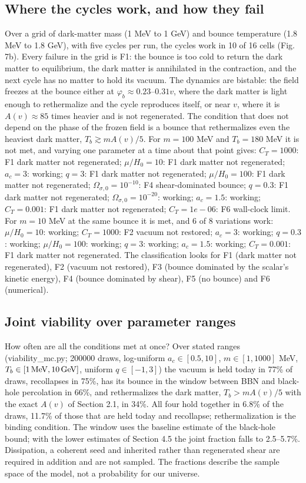 \documentclass[pdflatex,sn-mathphys-num]{sn-jnl}
\begin{document}
\subsection{Where the cycles work, and how they fail}
Over a grid of dark-matter mass (1 MeV to 1 GeV) and bounce temperature (1.8 MeV to 1.8 GeV), with five cycles per run, the cycles work in 10 of 16 cells (Fig. 7b). Every failure in the grid is F1: the bounce is too cold to return the dark matter to equilibrium, the dark matter is annihilated in the contraction, and the next cycle has no matter to hold its vacuum. The dynamics are bistable: the field freezes at the bounce either at $\varphi_b\approx0.23$--$0.31v$, where the dark matter is light enough to rethermalize and the cycle reproduces itself, or near $v$, where it is $A(v)\approx85$ times heavier and is not regenerated. The condition that does not depend on the phase of the frozen field is a bounce that rethermalizes even the heaviest dark matter, $T_b\gtrsim mA(v)/5$. For $m=100$ MeV and $T_b=180$ MeV it is not met, and varying one parameter at a time about that point gives: $C_T=1000$: F1 dark matter not regenerated; $\mu/H_0=10$: F1 dark matter not regenerated; $a_c=3$: working; $q=3$: F1 dark matter not regenerated; $\mu/H_0=100$: F1 dark matter not regenerated; $\Omega_{\sigma,0}=10^{-10}$: F4 shear-dominated bounce; $q=0.3$: F1 dark matter not regenerated; $\Omega_{\sigma,0}=10^{-20}$: working; $a_c=1.5$: working; $C_T=0.001$: F1 dark matter not regenerated; $C_T=1e-06$: F6 wall-clock limit. For $m=10$ MeV at the same bounce it is met, and 6 of 8 variations work: $\mu/H_0=10$: working; $C_T=1000$: F2 vacuum not restored; $a_c=3$: working; $q=0.3$: working; $\mu/H_0=100$: working; $q=3$: working; $a_c=1.5$: working; $C_T=0.001$: F1 dark matter not regenerated. The classification looks for F1 (dark matter not regenerated), F2 (vacuum not restored), F3 (bounce dominated by the scalar's kinetic energy), F4 (bounce dominated by shear), F5 (no bounce) and F6 (numerical).

\subsection{Joint viability over parameter ranges}
How often are all the conditions met at once? Over stated ranges (viability\_mc.py; 200000 draws, log-uniform $a_c\in[0.5,10]$, $m\in[1,1000]$ MeV, $T_b\in[1\,{\rm MeV},10\,{\rm GeV}]$, uniform $q\in[-1,3]$) the vacuum is held today in 77\% of draws, recollapses in 75\%, has its bounce in the window between BBN and black-hole percolation in 66\%, and rethermalizes the dark matter, $T_b>mA(v)/5$ with the exact $A(v)$ of Section 2.1, in 34\%. All four hold together in 6.8\% of the draws, 11.7\% of those that are held today and recollapse; rethermalization is the binding condition. The window uses the baseline estimate of the black-hole bound; with the lower estimates of Section 4.5 the joint fraction falls to 2.5--5.7\%. Dissipation, a coherent seed and inherited rather than regenerated shear are required in addition and are not sampled. The fractions describe the sample space of the model, not a probability for our universe.
\end{document}
